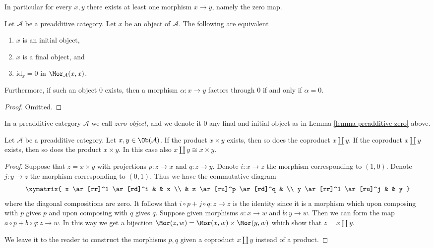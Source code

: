 \noindent
In particular for every $x, y$ there exists at least
one morphism $x \to y$, namely the zero map.

\begin{lemma}
\label{lemma-preadditive-zero}
Let $\mathcal{A}$ be a preadditive category.
Let $x$ be an object of $\mathcal{A}$.
The following are equivalent
\begin{enumerate}
\item $x$ is an initial object,
\item $x$ is a final object, and
\item $\text{id}_x = 0$ in $\Mor_\mathcal{A}(x, x)$.
\end{enumerate}
Furthermore, if such an object $0$ exists, then a morphism
$\alpha : x \to y$ factors through $0$ if and only if $\alpha = 0$.
\end{lemma}

\begin{proof}
Omitted.
\end{proof}

\begin{definition}
\label{definition-zero-object}
In a preadditive category $\mathcal{A}$ we call
{\it zero object}, and we denote it $0$
any final and initial object as in Lemma \ref{lemma-preadditive-zero} above.
\end{definition}

\begin{lemma}
\label{lemma-preadditive-direct-sum}
Let $\mathcal{A}$ be a preadditive category.
Let $x, y \in \Ob(\mathcal{A})$.
If the product $x \times y$ exists, then so does
the coproduct $x \coprod y$.
If the coproduct $x \coprod y$ exists, then so does
the product $x \times y$. In this case
also $x \coprod y \cong x \times y$.
\end{lemma}

\begin{proof}
Suppose that $z = x \times y$ with projections
$p : z \to x$ and $q : z \to y$. Denote $i : x \to z$
the morphism corresponding to $(1, 0)$. Denote $j : y \to z$
the morphism corresponding to $(0, 1)$. Thus we have the
commutative diagram
$$
\xymatrix{
x \ar[rr]^1 \ar[rd]^i & & x \\
& z \ar[ru]^p \ar[rd]^q & \\
y \ar[rr]^1 \ar[ru]^j & & y
}
$$
where the diagonal compositions are zero. It follows that
$i \circ p + j \circ q : z \to z$ is the identity since
it is a morphism which upon composing with $p$ gives $p$
and upon composing with $q$ gives $q$.
Suppose given morphisms $a : x \to w$ and $b : y \to w$.
Then we can form the map $a \circ p + b \circ q : z \to w$.
In this way we get a bijection $\Mor(z, w)
= \Mor(x, w) \times \Mor(y, w)$ which
show that $z = x \coprod y$.

\medskip\noindent
We leave it to the reader to construct the morphisms
$p, q$ given a coproduct $x \coprod y$ instead of a
product.
\end{proof}

